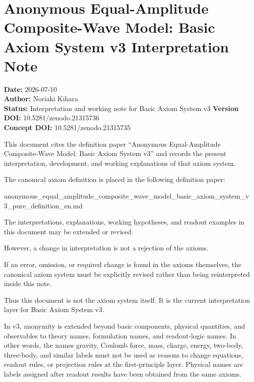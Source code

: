 \documentclass[
  a4paper]{article}
\author{}
\date{}
\newenvironment{Shaded}{}{}
\newcommand{\NormalTok}[1]{#1}
\begin{document}
\section{Anonymous Equal-Amplitude Composite-Wave Model: Basic Axiom
System v3 Interpretation
Note}\label{anonymous-equal-amplitude-composite-wave-model-basic-axiom-system-v3-interpretation-note}

\textbf{Date:} 2026-07-10\\
\textbf{Author:} Noriaki Kihara\\
\textbf{Status:} Interpretation and working note for Basic Axiom System
v3 \textbf{Version DOI:} 10.5281/zenodo.21315736\\
\textbf{Concept DOI:} 10.5281/zenodo.21315735

This document cites the definition paper ``Anonymous Equal-Amplitude
Composite-Wave Model: Basic Axiom System v3'' and records the present
interpretation, development, and working explanations of that axiom
system.

The canonical axiom definition is placed in the following definition
paper:

\begin{Shaded}
\begin{Highlighting}[]
\NormalTok{anonymous\_equal\_amplitude\_composite\_wave\_model\_basic\_axiom\_system\_v3\_pure\_definition\_en.md}
\end{Highlighting}
\end{Shaded}

The interpretations, explanations, working hypotheses, and readout
examples in this document may be extended or revised.

However, a change in interpretation is not a rejection of the axioms.

If an error, omission, or required change is found in the axioms
themselves, the canonical axiom system must be explicitly revised rather
than being reinterpreted inside this note.

Thus this document is not the axiom system itself. It is the current
interpretation layer for Basic Axiom System v3.

In v3, anonymity is extended beyond basic components, physical
quantities, and observables to theory names, formulation names, and
readout-logic names. In other words, the names gravity, Coulomb force,
mass, charge, energy, two-body, three-body, and similar labels must not
be used as reasons to change equations, readout rules, or projection
rules at the first-principle layer. Physical names are labels assigned
after readout results have been obtained from the same axioms.
\end{document}
